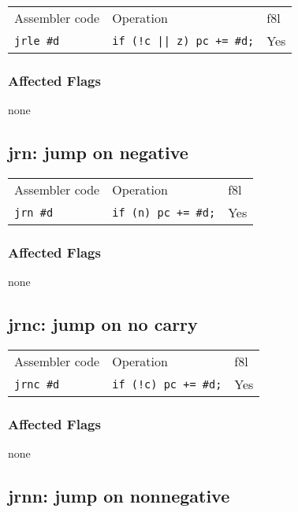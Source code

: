 \documentclass{book}
\begin{document}
\begin{tabular}{l l l}
Assembler code    & Operation                        & f8l \\
\texttt{jrle \#d} & \texttt{if (!c || z) pc += \#d;} & Yes \\
\end{tabular}

\subsubsection*{Affected Flags}

none


\subsection{jrn: jump on negative}

\begin{tabular}{l l l}
Assembler code   & Operation                  & f8l \\
\texttt{jrn \#d} & \texttt{if (n) pc += \#d;} & Yes \\
\end{tabular}

\subsubsection*{Affected Flags}

none


\subsection{jrnc: jump on no carry}

\begin{tabular}{l l l}
Assembler code    & Operation                    & f8l \\
\texttt{jrnc \#d} & \texttt{if (!c) pc += \#d;} & Yes \\
\end{tabular}

\subsubsection*{Affected Flags}

none


\subsection{jrnn: jump on nonnegative}
\end{document}
